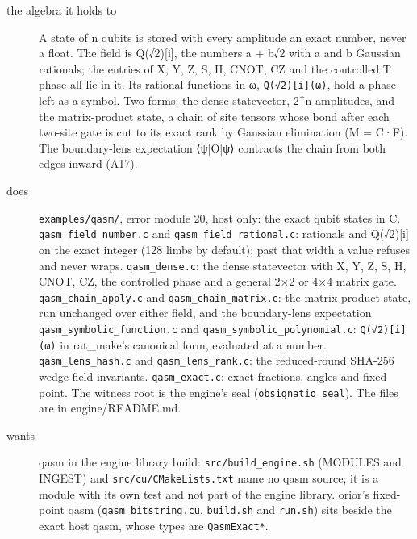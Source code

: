 \begin{description}
\item[{the algebra it holds to}] A state of n qubits is stored with every amplitude an exact number, never a float. The field is Q(√2)[i], the numbers a + b√2 with a and b Gaussian rationals; the entries of X, Y, Z, S, H, CNOT, CZ and the controlled T phase all lie in it. Its rational functions in ω, \texttt{Q(√2)[i](ω)}, hold a phase left as a symbol. Two forms: the dense statevector, 2\textasciicircum{}n amplitudes, and the matrix-product state, a chain of site tensors whose bond after each two-site gate is cut to its exact rank by Gaussian elimination (M = C·F). The boundary-lens expectation ⟨ψ|O|ψ⟩ contracts the chain from both edges inward (A17).
\item[{does}] \texttt{examples/\allowbreak{}qasm/\allowbreak{}}, error module 20, host only: the exact qubit states in C. \texttt{qasm\_\allowbreak{}field\_\allowbreak{}number.\allowbreak{}c} and \texttt{qasm\_\allowbreak{}field\_\allowbreak{}rational.\allowbreak{}c}: rationals and Q(√2)[i] on the exact integer (128 limbs by default); past that width a value refuses and never wraps. \texttt{qasm\_\allowbreak{}dense.\allowbreak{}c}: the dense statevector with X, Y, Z, S, H, CNOT, CZ, the controlled phase and a general 2×2 or 4×4 matrix gate. \texttt{qasm\_\allowbreak{}chain\_\allowbreak{}apply.\allowbreak{}c} and \texttt{qasm\_\allowbreak{}chain\_\allowbreak{}matrix.\allowbreak{}c}: the matrix-product state, run unchanged over either field, and the boundary-lens expectation. \texttt{qasm\_\allowbreak{}symbolic\_\allowbreak{}function.\allowbreak{}c} and \texttt{qasm\_\allowbreak{}symbolic\_\allowbreak{}polynomial.\allowbreak{}c}: \texttt{Q(√2)[i](ω)} in rat\_\allowbreak{}make's canonical form, evaluated at a number. \texttt{qasm\_\allowbreak{}lens\_\allowbreak{}hash.\allowbreak{}c} and \texttt{qasm\_\allowbreak{}lens\_\allowbreak{}rank.\allowbreak{}c}: the reduced-round SHA-256 wedge-field invariants. \texttt{qasm\_\allowbreak{}exact.\allowbreak{}c}: exact fractions, angles and fixed point. The witness root is the engine's seal (\texttt{obsignatio\_\allowbreak{}seal}). The files are in engine/README.md.
\item[{wants}] qasm in the engine library build: \texttt{src/\allowbreak{}build\_\allowbreak{}engine.\allowbreak{}sh} (MODULES and INGEST) and \texttt{src/\allowbreak{}cu/\allowbreak{}CMake\allowbreak{}Lists.\allowbreak{}txt} name no qasm source; it is a module with its own test and not part of the engine library. orior's fixed-point qasm (\texttt{qasm\_\allowbreak{}bitstring.\allowbreak{}cu}, \texttt{build.\allowbreak{}sh} and \texttt{run.\allowbreak{}sh}) sits beside the exact host qasm, whose types are \texttt{Qasm\allowbreak{}Exact*}.

\end{description}
